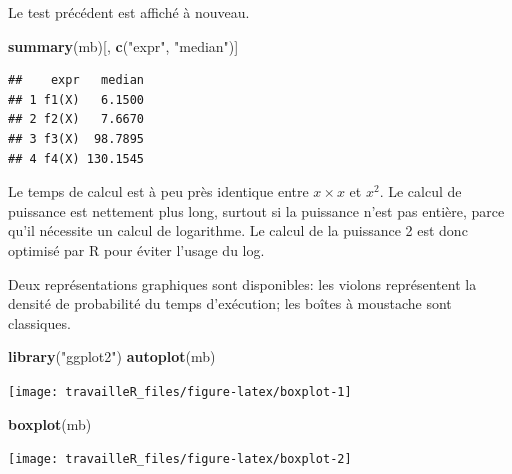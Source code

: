 \documentclass[
  12pt,
  french,
  a4paper,
  extrafontsizes,onecolumn,openright
  ]{memoir}
\newenvironment{Shaded}{\begin{snugshade}}{\end{snugshade}}
\newcommand{\FunctionTok}[1]{\textcolor[rgb]{0.13,0.29,0.53}{\textbf{#1}}}
\newcommand{\NormalTok}[1]{#1}
\newcommand{\StringTok}[1]{\textcolor[rgb]{0.31,0.60,0.02}{#1}}
\begin{document}
\normalsize

Le test précédent est affiché à nouveau.

\scriptsize

\begin{Shaded}
\begin{Highlighting}[]
\FunctionTok{summary}\NormalTok{(mb)[, }\FunctionTok{c}\NormalTok{(}\StringTok{"expr"}\NormalTok{, }\StringTok{"median"}\NormalTok{)]}
\end{Highlighting}
\end{Shaded}

\begin{verbatim}
##    expr   median
## 1 f1(X)   6.1500
## 2 f2(X)   7.6670
## 3 f3(X)  98.7895
## 4 f4(X) 130.1545
\end{verbatim}

\normalsize

Le temps de calcul est à peu près identique entre \(x \times x\) et \(x^2\).
Le calcul de puissance est nettement plus long, surtout si la puissance n'est pas entière, parce qu'il nécessite un calcul de logarithme.
Le calcul de la puissance 2 est donc optimisé par R pour éviter l'usage du log.

Deux représentations graphiques sont disponibles: les violons représentent la densité de probabilité du temps d'exécution; les boîtes à moustache sont classiques.

\scriptsize

\begin{Shaded}
\begin{Highlighting}[]
\FunctionTok{library}\NormalTok{(}\StringTok{"ggplot2"}\NormalTok{)}
\FunctionTok{autoplot}\NormalTok{(mb)}
\end{Highlighting}
\end{Shaded}

\begin{center}\texttt{[image: travailleR\_files/figure-latex/boxplot-1]} \end{center}

\begin{Shaded}
\begin{Highlighting}[]
\FunctionTok{boxplot}\NormalTok{(mb)}
\end{Highlighting}
\end{Shaded}

\begin{center}\texttt{[image: travailleR\_files/figure-latex/boxplot-2]} \end{center}

\normalsize
\end{document}
